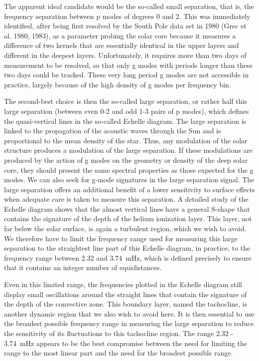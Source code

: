 \documentclass[bibyear]{aa}
\begin{document}
The apparent ideal candidate would be the so-called small separation, that is, the frequency separation between p modes of degrees 0 and 2. This was immediately identified, after being first resolved by the South Pole data set in 1980 (Grec et al. 1980, 1983), as a parameter probing the solar core because it measures a difference of two kernels that are essentially identical in the upper layers and different in the deepest layers. Unfortunately, it requires more than two days of measurement to be resolved, so that only g modes with periods longer than these two days could be tracked. These very long period g modes are not accessible in practice, largely because of the high density of g modes per frequency bin.

The second-best choice is then the so-called large separation, or rather half this large separation  (between even 0-2 and odd 1-3 pairs of p modes), which defines the quasi-vertical lines in the so-called Echelle diagram.  
The large separation is linked to the propagation of the acoustic waves through the Sun and is proportional to the mean density of the star. Thus, any modulation of the solar structure produces a modulation of the large separation. If these modulations are produced by the action of g modes on the geometry or density of the deep solar core, they should present the same spectral properties as those expected for the g modes. We can also seek for g-mode signatures in the large separation signal.
The large separation offers an additional  benefit of a lower sensitivity to surface effects when adequate care is taken to measure this separation. A detailed study of the Echelle diagram shows that the almost vertical lines have a general S-shape that contains the signature of the depth of the helium ionization layer. This layer, not far below the solar surface, is again a turbulent region, which we wish to avoid. We therefore have to limit the frequency range used for measuring this large separation to the straightest line part of this Echelle diagram, in practice, to the frequency range  between  2.32 and 3.74~mHz, which is
defined precisely to ensure that it contains an integer number of equidistances. 

Even in this limited range, the frequencies plotted in the Echelle diagram still display small oscillations around the straight lines that contain the signature of the depth of the convective zone. This boundary layer, named the tachocline, is another dynamic region that we also wish to avoid here. It is then essential to use the broadest possible frequency range in measuring the large separation to reduce the sensitivity of its fluctuations to this tachocline region. The range 2.32 - 3.74~mHz appears to be the best compromise between the need for limiting the range to the most  linear part and the need for the broadest possible range. 
\end{document}
